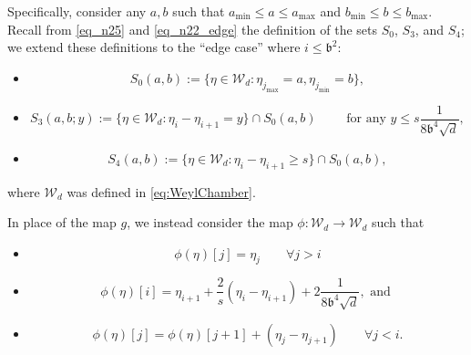 \documentclass[11pt,letterpaper]{article}
\begin{document}
 
Specifically, consider any $a,b$ such that $a_{\mathrm{min}} \leq a \leq  a_{\mathrm{max}}$  and $b_{\mathrm{min}} \leq b \leq  b_{\mathrm{max}}$.
%
 Recall from \eqref{eq_n25} and \eqref{eq_n22_edge} the definition of the sets $S_0$, $S_3$, and $S_4$; we extend these definitions to the ``edge case'' where $i \leq \mathfrak{b}^2$:
%
\begin{itemize}
\item \begin{equation}\label{eq_n25_edge}
    S_0(a,b):= \{ \eta \in \mathcal{W}_d : \eta_{j_{\mathrm{max}}} = a, \eta_{j_{\mathrm{min}}} = b\},
\end{equation}

\item  
\begin{equation}\label{eq_n22_edge}
S_3(a,b; y) :=  \{\eta \in \mathcal{W}_d : \eta_i-\eta_{i+1} = y\} \cap S_0(a,b) \qquad \textrm{ for any } y \leq s\frac{1}{8\mathfrak{b}^4\sqrt{d} }, 
\end{equation}

\item 
\begin{equation*}
S_4(a,b) :=  \{\eta \in \mathcal{W}_d : \eta_i-\eta_{i+1} \geq s\} \cap S_0(a,b),
\end{equation*}

\end{itemize}
%
 where $\mathcal{W}_d$ was defined in \eqref{eq:WeylChamber}.






  In place of the map $g$, we instead consider the map $\phi:  \mathcal{W}_d \rightarrow \mathcal{W}_d$ such that 

  \begin{itemize}
  
  
  \item 
\begin{equation}\label{eq_phi1}
      \phi(\eta)[j] = \eta_j \qquad \forall j > i
      \end{equation}
  

 \item \begin{equation}\label{eq_phi2}
      \phi(\eta)[i] =  \eta_{i+1} + \frac{2}{s}(\eta_{i}- \eta_{i+1})+ 2\frac{1}{8\mathfrak{b}^4\sqrt{d}}, \mbox{ and }
      \end{equation} 
      
       \item \begin{equation}\label{eq_phi3}
      \phi(\eta)[j] =  \phi(\eta)[j+1] + (\eta_{j}- \eta_{j+1}) \qquad \forall j < i.
      \end{equation} 
  
\end{itemize}
\end{document}
